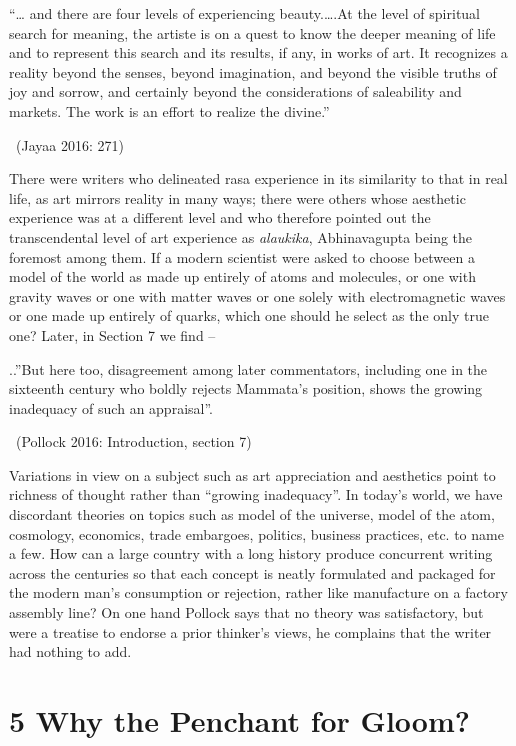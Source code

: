 \begin{myquote}
“… and there are four levels of experiencing beauty.….At the level of spiritual search for meaning, the artiste is on a quest to know the deeper meaning of life and to represent this search and its results, if any, in works of art. It recognizes a reality beyond the senses, beyond imagination, and beyond the visible truths of joy and sorrow, and certainly beyond the considerations of saleability and markets. The work is an effort to realize the divine.” 

~\hfill (Jayaa 2016: 271)
\end{myquote}

There were writers who delineated rasa experience in its similarity to that in real life, as art mirrors reality in many ways; there were others whose aesthetic experience was at a different level and who therefore pointed out the transcendental level of art experience as \textit{alaukika}, Abhinavagupta being the foremost among them. If a modern scientist were asked to choose between a model of the world as made up entirely of atoms and molecules, or one with gravity waves or one with matter waves or one solely with electromagnetic waves or one made up entirely of quarks, which one should he select as the only true one? Later, in Section 7 we find –

\begin{myquote}
..”But here too, disagreement among later commentators, including one in the sixteenth century who boldly rejects Mammata’s position, shows the growing inadequacy of such an appraisal”. 

~\hfill (Pollock 2016: Introduction, section 7)
\end{myquote}

Variations in view on a subject such as art appreciation and aesthetics point to richness of thought rather than “growing inadequacy”. In today’s world, we have discordant theories on topics such as model of the universe, model of the atom, cosmology, economics, trade embargoes, politics, business practices, etc. to name a few. How can a large country with a long history produce concurrent writing across the centuries so that each concept is neatly formulated and packaged for the modern man’s consumption or rejection, rather like manufacture on a factory assembly line? On one hand Pollock says that no theory was satisfactory, but were a treatise to endorse a prior thinker’s views, he complains that the writer had nothing to add.


\section*{5 Why the Penchant for Gloom?}

